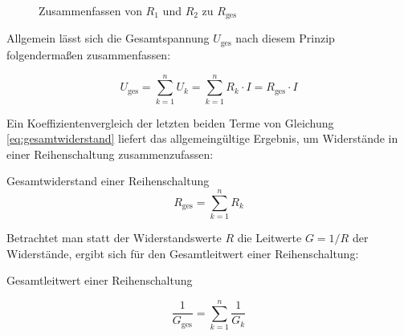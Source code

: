\begin{frame}
{	\begin{figure}[h!]
		\begin{center}

			



			\caption{Zusammenfassen von $R_1$ und $R_2$ zu $R_\mathrm{ges}$}

			\label{fig:rges}
		\end{center}
	\end{figure}

	Allgemein lässt sich die Gesamtspannung $U_\mathrm{ges}$ nach diesem Prinzip folgendermaßen zusammenfassen:

	\begin{equation}
		U_\mathrm{ges} = \sum_{k=1}^{n} U_k = \sum_{k=1}^{n} R_k \cdot I = R_\mathrm{ges} \cdot I
	\label{eq:gesamtwiderstand}	
	\end{equation}

	Ein Koeffizientenvergleich der letzten beiden Terme von Gleichung \ref{eq:gesamtwiderstand} liefert das allgemeingültige 
	Ergebnis, um Widerstände in einer Reihenschaltung zusammenzufassen:

	\begin{Merksatz}{Gesamtwiderstand einer Reihenschaltung}{}
		\begin{equation}
			R_\mathrm{ges} = \sum_{k=1}^{n} R_k
		\end{equation}
	\end{Merksatz}

	Betrachtet man statt der Widerstandswerte $R$ die Leitwerte $G = 1/R$ der Widerstände, ergibt sich für den Gesamtleitwert
	einer Reihenschaltung: 


	\begin{Merksatz}{Gesamtleitwert einer Reihenschaltung}{}
	

		\begin{equation}
			\frac{1}{G_\mathrm{ges}} = \sum_{k=1}^{n} \frac{1}{G_k}
		\end{equation}


\end{Merksatz}}
\end{frame}

